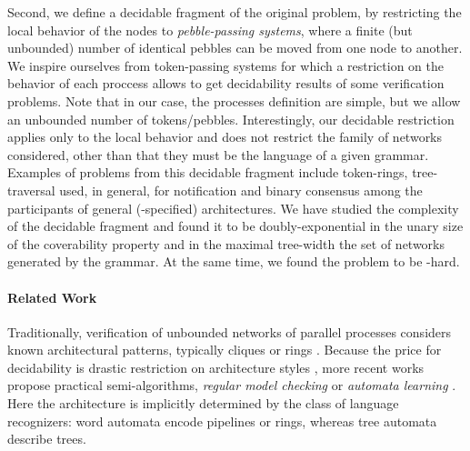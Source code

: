Second, we define a decidable fragment of the original problem, by
restricting the local behavior of the nodes to \emph{pebble-passing
  systems}, where a finite (but unbounded) number of identical pebbles
can be moved from one node to another. We inspire ourselves from
token-passing
systems\cite{aminof-paramtoken-vmcai14,aminof-model-ijcar16} for which
a restriction on the behavior of each proccess allows to get
decidability results of some verification problems. Note that in our
case, the processes definition are simple, but we allow an unbounded
number of tokens/pebbles. Interestingly, our decidable restriction
applies only to the local behavior and does not restrict the family of
networks considered, other than that they must be the language of a
given \hrtext{} grammar. Examples of problems from this decidable
fragment include token-rings, tree-traversal used, in general, for
notification and binary consensus among the participants of general
(\hrtext-specified) architectures. We have studied the complexity of
the decidable fragment and found it to be doubly-exponential in the
unary size of the coverability property and in the maximal tree-width
the set of networks generated by the grammar. At the same time, we
found the problem to be \pspace-hard.

\vspace*{-.5\baselineskip}
\paragraph{Related Work}
Traditionally, verification of unbounded networks of parallel
processes considers known architectural patterns, typically cliques or
rings \cite{GermanSistla92,ClarkeGrumbergBrowne86}. Because the price
for decidability is drastic restriction on architecture styles
\cite{BloemJacobsKhalimovKonnovRubinVeithWidder15}, more recent works
propose practical semi-algorithms, \eg \emph{regular model checking}
\cite{KestenMalerMarcusPnueliShahar01} or \emph{automata learning}
\cite{ChenHongLinRummer17}. Here the architecture is implicitly
determined by the class of language recognizers: word automata encode
pipelines or rings, whereas tree automata describe trees.

